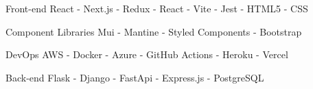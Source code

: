 

\begin{cvskills}
    
  \cvskill
    {Front-end} %
    {React - Next.js - Redux - React - Vite - Jest - HTML5 - CSS} %

\cvskill
  {Component Libraries} %
  {Mui - Mantine - Styled Components - Bootstrap} %
    
  \cvskill
    {DevOps} %
    {AWS - Docker - Azure - GitHub Actions - Heroku - Vercel} %

  \cvskill
    {Back-end} %
    {Flask - Django - FastApi - Express.js -  PostgreSQL} %


\end{cvskills}
